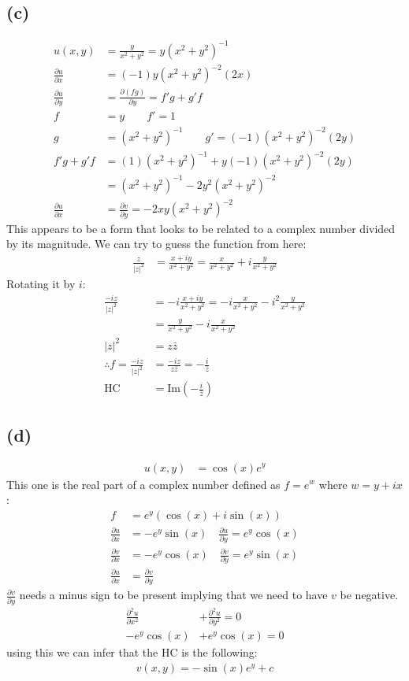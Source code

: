 \documentclass{article}
\let\oldcos\cos
\let\oldsin\sin
\renewcommand{\cos}[1]{\oldcos\left(#1\right)}
\renewcommand{\sin}[1]{\oldsin\left(#1\right)}
\newcommand{\parder}[2]{\frac{\partial#1}{\partial#2}}
\newcommand{\secparder}[2]{\frac{\partial^2#1}{\partial#2^2}}
\begin{document}
\subsection*{(c)}
\begin{align*}
  u(x,y) &= \frac{y}{x^2+y^2} = y(x^2+y^2)^{-1}\\
  \parder{u}{x} &= (-1)y(x^2+y^2)^{-2}(2x)\\
  \parder{u}{y} &= \parder{(fg)}{y} = f'g+g'f\\
  f &= y \quad \quad f' = 1\\
  g &= (x^2+y^2)^{-1} \quad \quad g' = (-1)(x^2+y^2)^{-2}(2y)\\
  f'g+g'f &= (1)(x^2+y^2)^{-1} + y(-1)(x^2+y^2)^{-2}(2y) \\
         &= (x^2+y^2)^{-1} - 2y^2(x^2+y^2)^{-2}\\
  \parder{u}{x} &= \parder{v}{y} = -2xy(x^2+y^2)^{-2}
\end{align*}
This appears to be a form that looks to be related to a complex number divided by its magnitude. We can try to guess the function from here:
\begin{align*}
  \frac{z}{|z|^2} &= \frac{x+iy}{x^2+y^2} = \frac{x}{x^2+y^2} + i\frac{y}{x^2+y^2}
\end{align*}
Rotating it by $i$:
\begin{align*}
  \frac{-iz}{|z|^2} &= -i\frac{x+iy}{x^2+y^2} = -i\frac{x}{x^2+y^2} -i^2\frac{y}{x^2+y^2}\\
                    &= \frac{y}{x^2+y^2}-i\frac{x}{x^2+y^2}\\
  |z|^2 &= z\bar z \\
  \therefore f = \frac{-iz}{|z|^2} &= \frac{-iz}{z\bar z} = -\frac{i}{\bar z}\\
  \text{HC } &= \text{Im}\left(-\frac{i}{\bar z}\right)
\end{align*}
\subsection*{(d)}
\begin{align*}
  u(x,y) &= \cos{x}e^y
\end{align*}
This one is the real part of a complex number defined as $f = e^w$ where $w = y+ix$:
\begin{align*}
  f &= e^y(\cos{x}+i\sin{x}) \\
  \parder{u}{x} &= -e^y\sin{x} \quad \parder{u}{y} = e^y\cos{x}\\
  \parder{v}{x} &= -e^y\cos{x} \quad \parder{v}{y} = e^y\sin{x}\\
  \parder{u}{x} &= \parder{v}{y}
\end{align*}
$\parder{v}{y}$ needs a minus sign to be present implying that we need to have $v$ be negative.
\begin{align*}
  \secparder{u}{x} &+ \secparder{u}{y} = 0  \\
  -e^y\cos{x} &+ e^y\cos{x} = 0
\end{align*}
using this we can infer that the HC is the following:
\begin{align*}
  v(x,y) = -\sin{x}e^y + c
\end{align*}
\end{document}
